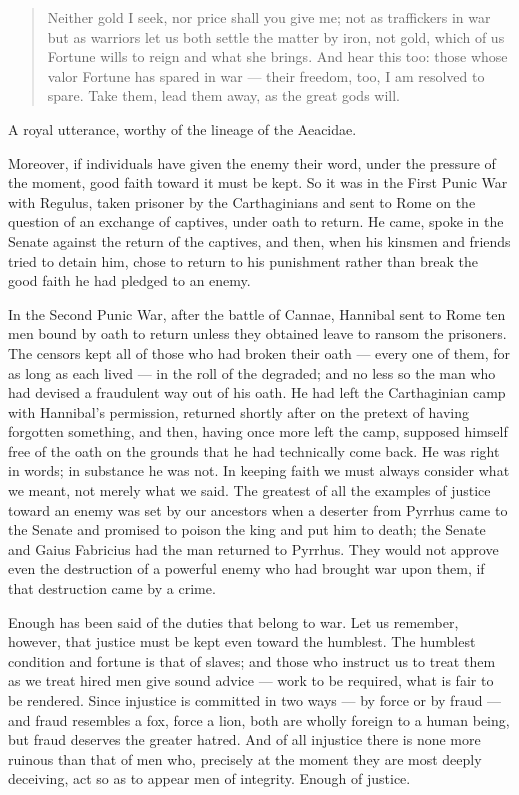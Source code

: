 \begin{quote}
Neither gold I seek, nor price shall you give me; not as traffickers in war but as warriors let us both settle the matter by iron, not gold, which of us Fortune wills to reign and what she brings. And hear this too: those whose valor Fortune has spared in war — their freedom, too, I am resolved to spare. Take them, lead them away, as the great gods will.
\end{quote}

A royal utterance, worthy of the lineage of the Aeacidae.

 Moreover, if individuals have given the enemy their word, under the pressure of the moment, good faith toward it must be kept. So it was in the First Punic War with Regulus, taken prisoner by the Carthaginians and sent to Rome on the question of an exchange of captives, under oath to return. He came, spoke in the Senate against the return of the captives, and then, when his kinsmen and friends tried to detain him, chose to return to his punishment rather than break the good faith he had pledged to an enemy.

 In the Second Punic War, after the battle of Cannae, Hannibal sent to Rome ten men bound by oath to return unless they obtained leave to ransom the prisoners. The censors kept all of those who had broken their oath — every one of them, for as long as each lived — in the roll of the degraded; and no less so the man who had devised a fraudulent way out of his oath. He had left the Carthaginian camp with Hannibal's permission, returned shortly after on the pretext of having forgotten something, and then, having once more left the camp, supposed himself free of the oath on the grounds that he had technically come back. He was right in words; in substance he was not. In keeping faith we must always consider what we meant, not merely what we said. The greatest of all the examples of justice toward an enemy was set by our ancestors when a deserter from Pyrrhus came to the Senate and promised to poison the king and put him to death; the Senate and Gaius Fabricius had the man returned to Pyrrhus. They would not approve even the destruction of a powerful enemy who had brought war upon them, if that destruction came by a crime.

 Enough has been said of the duties that belong to war. Let us remember, however, that justice must be kept even toward the humblest. The humblest condition and fortune is that of slaves; and those who instruct us to treat them as we treat hired men give sound advice — work to be required, what is fair to be rendered. Since injustice is committed in two ways — by force or by fraud — and fraud resembles a fox, force a lion, both are wholly foreign to a human being, but fraud deserves the greater hatred. And of all injustice there is none more ruinous than that of men who, precisely at the moment they are most deeply deceiving, act so as to appear men of integrity. Enough of justice.

